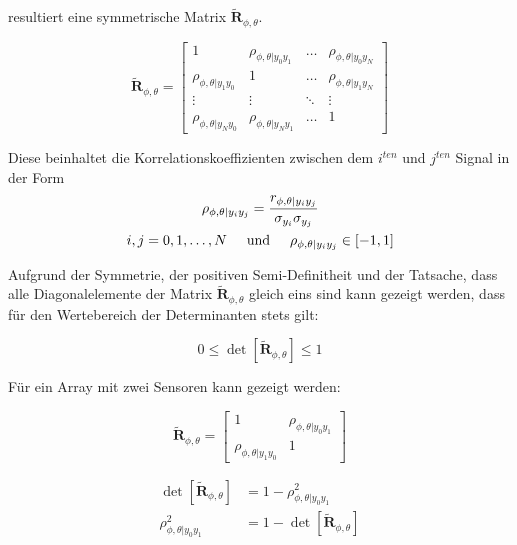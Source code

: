 resultiert eine symmetrische Matrix $\mathbf{\tilde R}_{\phi,\theta}$.
	
	
\begin{equation}
\mathbf{\tilde R}_{\phi,\theta} = 
    \begin{bmatrix}
    1	     & \rho_{\phi,\theta | y_0 y_1}     & \dots & \rho_{\phi,\theta | y_0 y_N}      \\
    \rho_{\phi,\theta | y_1 y_0}  & 1      & \dots & \rho_{\phi,\theta | y_1 y_N}                    \\
    \vdots	            & \vdots 	           & \ddots & \vdots \\
    \rho_{\phi,\theta | y_N y_0} 	  & \rho_{\phi,\theta | y_N y_1}     & \dots	 & 1
    \end{bmatrix}
\end{equation}
	
Diese beinhaltet die Korrelationskoeffizienten zwischen dem $i^{ten}$ und $j^{ten}$ Signal in der Form
\begin{gather}
    \rho_{\phi,\theta | y_i y_j} = \frac{r_{\phi,\theta | y_i y_j}}{\sigma_{y_i} \sigma_{y_j}} \\ 
    i,j = 0,1, \dots, N \hspace{0.5cm} \text{und} \hspace{0.5cm} \rho_{\phi,\theta | y_i y_j} \in [-1, 1] \nonumber
\end{gather}

Aufgrund der Symmetrie, der positiven Semi-Definitheit und der Tatsache, dass alle Diagonalelemente der Matrix $\mathbf{\tilde R}_{\phi,\theta}$ gleich eins sind kann gezeigt werden, dass für den Wertebereich der Determinanten stets gilt:

\begin{equation}
    0 \leq \det\left [ \mathbf{\tilde R}_{\phi,\theta} \right] \leq 1
\end{equation}


Für ein Array mit zwei Sensoren kann gezeigt werden:

\begin{equation}
\mathbf{\tilde R}_{\phi,\theta} = 
    \begin{bmatrix}
        1 & \rho_{\phi,\theta | y_0 y_1} \\
        \rho_{\phi,\theta | y_1 y_0} & 1
    \end{bmatrix}
\end{equation}

\begin{equation}
    \begin{split}
        \det\left [ \mathbf{\tilde R}_{\phi,\theta} \right] & = 1 - \rho_{\phi,\theta | y_0 y_1}^2 \\
        \rho_{\phi,\theta | y_0 y_1}^2 & = 1 - \det\left [ \mathbf{\tilde R}_{\phi,\theta} \right]
    \end{split}
\end{equation}

